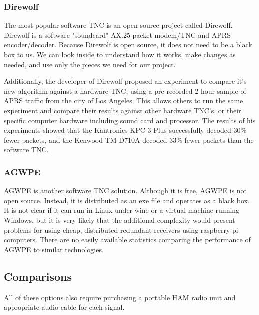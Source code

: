 \documentclass[onecolumn, draftclsnofoot, 10pt, compsoc]{IEEEtran}
\begin{document}
\subsubsection{Direwolf}
The most popular software TNC is an open source project called Direwolf.  Direwolf is a software "soundcard" AX.25 packet modem/TNC and APRS encoder/decoder.  Because Direwolf is open source, it does not need to be a black box to us.  We can look inside to understand how it works, make changes as needed, and use only the pieces we need for our project.\cite{3}

Additionally, the developer of Direwolf proposed an experiment to compare it's new algorithm against a hardware TNC, using a pre-recorded 2 hour sample of APRS traffic from the city of Los Angeles.  This allows others to run the same experiment and compare their results against other hardware TNC's, or their specific computer hardware including sound card and processor.  The results of his experiments showed that the Kantronics KPC-3 Plus successfully decoded 30\% fewer packets, and the Kenwood TM-D710A decoded 33\% fewer packets than the software TNC.\cite{4}

\subsubsection{AGWPE}
AGWPE is another software TNC solution.  Although it is free, AGWPE is not open source.  Instead, it is distributed as an exe file and operates as a black box.  It is not clear if it can run in Linux under wine or a virtual machine running Windows, but it is very likely that the additional complexity would present problems for using cheap, distributed redundant receivers using raspberry pi computers.  There are no easily available statistics comparing the performance of AGWPE to similar technologies.\cite{11}

\subsection{Comparisons}
All of these options also require purchasing a portable HAM radio unit and appropriate audio cable for each signal.

\begin{center}
\end{center}
\end{document}
